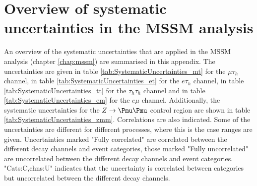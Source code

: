 \appendix
\renewcommand{\chaptername}{Appendix}
\chapter{\texorpdfstring{Overview of systematic uncertainties in the MSSM \AHtotautau analysis}{Overview of systematic uncertainties in the MSSM A/H to tautau analysis}}
\label{appendix:uncerts}
An overview of the systematic uncertainties that are applied in the MSSM \AHtotautau analysis (chapter \ref{chap:mssm})
are summarised in this appendix. The uncertainties are given in
table \ref{tab:SystematicUncertainties_mt} for the $\mu\tau_h$
channel, in table \ref{tab:SystematicUncertainties_et} for the $e\tau_h$ channel,
in table \ref{tab:SystematicUncertainties_tt} for the $\tau_h\tau_h$ channel and
in table \ref{tab:SystematicUncertainties_em} for the $e\mu$ channel. Additionally,
the systematic uncertainties for the $Z\rightarrow\mumu$ control region are shown
in table \ref{tab:SystematicUncertainties_zmm}. Correlations are also indicated.
Some of the uncertainties
are different for different processes, where this is the case ranges are given.
Uncertainties marked "Fully correlated" are correlated between the different
decay channels and event categories, those marked "Fully uncorrelated" are
uncorrelated between the different decay channels and event categories. "Cats:C,chns:U"
indicates that the uncertainty is correlated between categories but uncorrelated between
the different decay channels.




